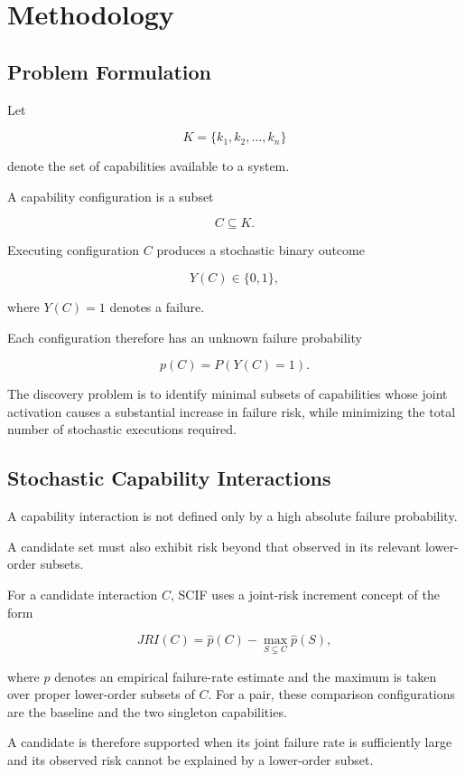 \section{Methodology}

\subsection{Problem Formulation}

Let

\[
K = \{k_1, k_2, \ldots, k_n\}
\]

denote the set of capabilities available to a system.

A capability configuration is a subset

\[
C \subseteq K.
\]

Executing configuration \(C\) produces a stochastic binary outcome

\[
Y(C) \in \{0,1\},
\]

where \(Y(C)=1\) denotes a failure.

Each configuration therefore has an unknown failure probability

\[
p(C)=P(Y(C)=1).
\]

The discovery problem is to identify minimal subsets of capabilities whose joint activation causes a substantial increase in failure risk, while minimizing the total number of stochastic executions required.

\subsection{Stochastic Capability Interactions}

A capability interaction is not defined only by a high absolute failure probability.

A candidate set must also exhibit risk beyond that observed in its relevant lower-order subsets.

For a candidate interaction \(C\), SCIF uses a joint-risk increment concept of the form

\[
JRI(C)
=
\hat{p}(C)
-
\max_{S \subsetneq C}
\hat{p}(S),
\]

where \(\hat{p}\) denotes an empirical failure-rate estimate and the maximum is taken over proper lower-order subsets of \(C\). For a pair, these comparison configurations are the baseline and the two singleton capabilities.

A candidate is therefore supported when its joint failure rate is sufficiently large and its observed risk cannot be explained by a lower-order subset.

